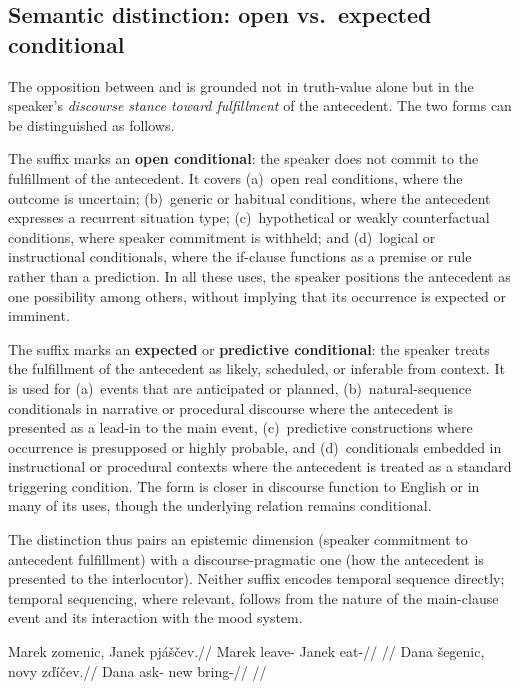 \subsection{Semantic distinction: open vs.\ expected conditional}
\label{sec:cond-semantics}

The opposition between  and  is grounded not in truth-value
alone but in the speaker's \emph{discourse stance toward fulfillment} of the
antecedent. The two forms can be distinguished as follows.

The suffix  marks an \textbf{open conditional}: the speaker does not
commit to the fulfillment of the antecedent. It covers (a)~open real conditions,
where the outcome is uncertain; (b)~generic or habitual conditions,
where the antecedent expresses a recurrent situation type; (c)~hypothetical or
weakly counterfactual conditions, where speaker commitment is withheld; and
(d)~logical or instructional conditionals, where the if-clause functions as a
premise or rule rather than a prediction. In all these uses, the speaker
positions the antecedent as one possibility among others, without implying that
its occurrence is expected or imminent.

The suffix  marks an \textbf{expected} or \textbf{predictive
conditional}: the speaker treats the fulfillment of the antecedent as likely,
scheduled, or inferable from context. It is used for (a)~events that are
anticipated or planned, (b)~natural-sequence conditionals in narrative or
procedural discourse where the antecedent is presented as a lead-in to the main
event, (c)~predictive  constructions where occurrence is
presupposed or highly probable, and (d)~conditionals embedded in instructional
or procedural contexts where the antecedent is treated as a standard triggering
condition. The form is closer in discourse function to English  or
 in many of its uses, though the underlying relation remains
conditional.

The distinction thus pairs an epistemic dimension (speaker commitment to
antecedent fulfillment) with a discourse-pragmatic one (how the antecedent is
presented to the interlocutor). Neither suffix encodes temporal sequence
directly; temporal sequencing, where relevant, follows from the nature of the
main-clause event and its interaction with the mood system.

\pex \label{ex:cond-open}
\a
\begingl
\gla Marek zomenic, Janek pjáščev.//
\glb Marek leave-\Cond{} Janek eat-\Irr{}//
\glft {} //
\endgl
\a
\begingl
\gla Dana šegenic, novy zďíčev.//
\glb Dana ask-\Cond{} new bring-\Irr{}//
\glft {} //
\endgl
\xe

